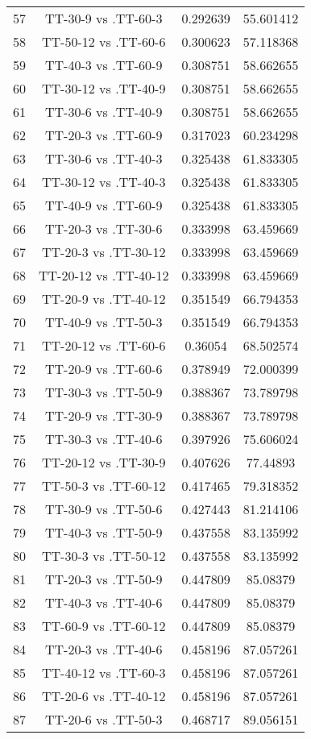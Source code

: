 \documentclass[a4paper,10pt]{article}
\begin{document}
\begin{landscape}
\begin{table}[!htp]
\begin{tabular}{cccc}
57&TT-30-9 vs .TT-60-3&0.292639&55.601412\\
58&TT-50-12 vs .TT-60-6&0.300623&57.118368\\
59&TT-40-3 vs .TT-60-9&0.308751&58.662655\\
60&TT-30-12 vs .TT-40-9&0.308751&58.662655\\
61&TT-30-6 vs .TT-40-9&0.308751&58.662655\\
62&TT-20-3 vs .TT-60-9&0.317023&60.234298\\
63&TT-30-6 vs .TT-40-3&0.325438&61.833305\\
64&TT-30-12 vs .TT-40-3&0.325438&61.833305\\
65&TT-40-9 vs .TT-60-9&0.325438&61.833305\\
66&TT-20-3 vs .TT-30-6&0.333998&63.459669\\
67&TT-20-3 vs .TT-30-12&0.333998&63.459669\\
68&TT-20-12 vs .TT-40-12&0.333998&63.459669\\
69&TT-20-9 vs .TT-40-12&0.351549&66.794353\\
70&TT-40-9 vs .TT-50-3&0.351549&66.794353\\
71&TT-20-12 vs .TT-60-6&0.36054&68.502574\\
72&TT-20-9 vs .TT-60-6&0.378949&72.000399\\
73&TT-30-3 vs .TT-50-9&0.388367&73.789798\\
74&TT-20-9 vs .TT-30-9&0.388367&73.789798\\
75&TT-30-3 vs .TT-40-6&0.397926&75.606024\\
76&TT-20-12 vs .TT-30-9&0.407626&77.44893\\
77&TT-50-3 vs .TT-60-12&0.417465&79.318352\\
78&TT-30-9 vs .TT-50-6&0.427443&81.214106\\
79&TT-40-3 vs .TT-50-9&0.437558&83.135992\\
80&TT-30-3 vs .TT-50-12&0.437558&83.135992\\
81&TT-20-3 vs .TT-50-9&0.447809&85.08379\\
82&TT-40-3 vs .TT-40-6&0.447809&85.08379\\
83&TT-60-9 vs .TT-60-12&0.447809&85.08379\\
84&TT-20-3 vs .TT-40-6&0.458196&87.057261\\
85&TT-40-12 vs .TT-60-3&0.458196&87.057261\\
86&TT-20-6 vs .TT-40-12&0.458196&87.057261\\
87&TT-20-6 vs .TT-50-3&0.468717&89.056151\\

\end{tabular}
\end{table}
\end{landscape}
\end{document}
